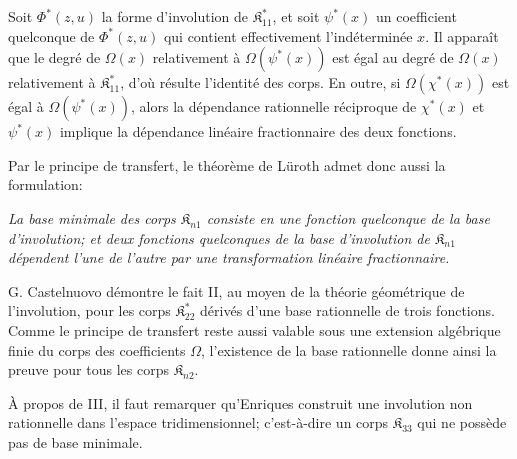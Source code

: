 \documentclass[11pt]{article}
\providecommand{\Kfield}{\mathfrak{K}}
\begin{document}
Soit $\Phi^*(z,u)$ la forme d'involution de $\Kfield^*_{11}$, et soit $\psi^*(x)$ un coefficient quelconque de $\Phi^*(z,u)$ qui contient effectivement l'indéterminée $x$. Il apparaît que le degré de $\Omega(x)$ relativement à $\Omega(\psi^*(x))$ est égal au degré de $\Omega(x)$ relativement à $\Kfield^*_{11}$, d'où résulte l'identité des corps. En outre, si $\Omega(\chi^*(x))$ est égal à $\Omega(\psi^*(x))$, alors la dépendance rationnelle réciproque de $\chi^*(x)$ et $\psi^*(x)$ implique la dépendance linéaire fractionnaire des deux fonctions.

Par le principe de transfert, le théorème de Lüroth admet donc aussi la formulation:

\emph{La base minimale des corps $\Kfield_{n1}$ consiste en une fonction quelconque de la base d'involution; et deux fonctions quelconques de la base d'involution de $\Kfield_{n1}$ dépendent l'une de l'autre par une transformation linéaire fractionnaire.}

G. Castelnuovo démontre le fait II, au moyen de la théorie géométrique de l'involution, pour les corps $\Kfield^*_{22}$ dérivés d'une base rationnelle de trois fonctions. Comme le principe de transfert reste aussi valable sous une extension algébrique finie du corps des coefficients $\Omega$, l'existence de la base rationnelle donne ainsi la preuve pour tous les corps $\Kfield_{n2}$.

À propos de III, il faut remarquer qu'Enriques construit une involution non rationnelle dans l'espace tridimensionnel; c'est-à-dire un corps $\Kfield_{33}$ qui ne possède pas de base minimale.
\end{document}
